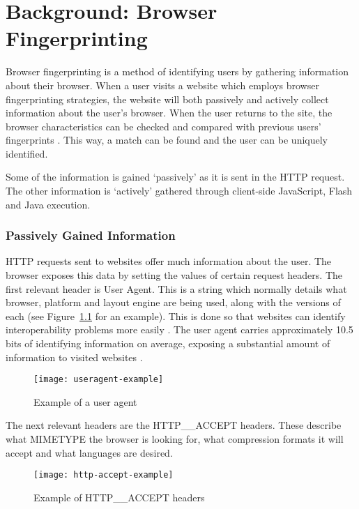 \chapter{Background: Browser Fingerprinting}

Browser fingerprinting is a method of identifying users by gathering information about their browser.
When a user visits a website which employs browser fingerprinting strategies, the website will both passively and actively collect information about the user's browser.
When the user returns to the site, the browser characteristics can be checked and compared with previous users' fingerprints \citep{fingerprinting}.
This way, a match can be found and the user can be uniquely identified.

Some of the information is gained `passively' as it is sent in the HTTP request.
The other information is `actively' gathered through client-side JavaScript, Flash and Java execution.

\subsection{Passively Gained Information}

HTTP requests sent to websites offer much information about the user.
The browser exposes this data by setting the values of certain request headers.
The first relevant header is User Agent.
This is a string which normally details what browser, platform and layout engine are being used, along with the versions of each (see Figure~\ref{fig:useragent-example} for an example).
This is done so that websites can identify interoperability problems more easily \citep{useragent}.
The user agent carries approximately 10.5 bits of identifying information on average, exposing a substantial amount of information to visited websites \citep{useragententropy}.

\begin{figure}[h]
\texttt{[image: useragent-example]}
\centering
\caption{Example of a user agent}
\label{fig:useragent-example}
\end{figure}

The next relevant headers are the HTTP\_\_ACCEPT headers.
These describe what MIMETYPE the browser is looking for, what compression formats it will accept and what languages are desired.

\begin{figure}[h]
\texttt{[image: http-accept-example]}
\centering
\caption{Example of HTTP\_\_ACCEPT headers}
\end{figure}

